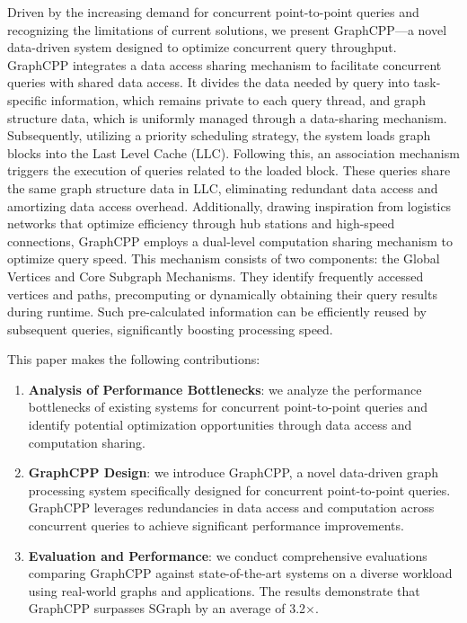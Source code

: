 \documentclass[10pt,journal,compsoc]{IEEEtran}
\begin{document}
Driven by the increasing demand for concurrent point-to-point queries and recognizing the limitations of current solutions, we present GraphCPP—a novel data-driven system designed to optimize concurrent query throughput.
GraphCPP integrates a data access sharing mechanism to facilitate concurrent queries with shared data access. It divides the data needed by query into task-specific information, which remains private to each query thread, and graph structure data, which is uniformly managed through a data-sharing mechanism. Subsequently, utilizing a priority scheduling strategy, the system loads graph blocks into the Last Level Cache (LLC). Following this, an association mechanism triggers the execution of queries related to the loaded block. These queries share the same graph structure data in LLC, eliminating redundant data access and amortizing data access overhead.
Additionally, drawing inspiration from logistics networks that optimize efficiency through hub stations and high-speed connections, GraphCPP employs a dual-level computation sharing mechanism to optimize query speed. This mechanism consists of two components: the Global Vertices and Core Subgraph Mechanisms. They identify frequently accessed vertices and paths, precomputing or dynamically obtaining their query results during runtime. Such pre-calculated information can be efficiently reused by subsequent queries, significantly boosting processing speed.


This paper makes the following contributions:
\begin{enumerate}
  \item{{\bf{Analysis of Performance Bottlenecks}}: we analyze the performance bottlenecks of existing systems for concurrent point-to-point queries and identify potential optimization opportunities through data access and computation sharing.}
  \item{{\bf{GraphCPP Design}}: we introduce GraphCPP, a novel data-driven graph processing system specifically designed for concurrent point-to-point queries. GraphCPP leverages redundancies in data access and computation across concurrent queries to achieve significant performance improvements.}
  \item{{\bf{Evaluation and Performance}}: we conduct comprehensive evaluations comparing GraphCPP against state-of-the-art systems on a diverse workload using real-world graphs and applications. The results demonstrate that GraphCPP surpasses SGraph by an average of 3.2×.}
\end{enumerate}
\end{document}
